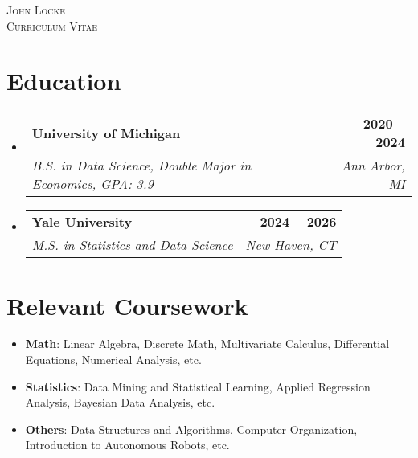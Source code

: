 \documentclass[letterpaper,11pt]{article}
\makeatletter
\newcommand{\resumeSubheading}[4]{
  \vspace{-2pt}\item
    \begin{tabular*}{1.0\textwidth}[t]{l@{\extracolsep{\fill}}r}
      \textbf{#1} & \textbf{\small #2} \\
      \textit{\small#3} & \textit{\small #4} \\
    \end{tabular*}\vspace{-7pt}
}
\newcommand{\resumeSubHeadingListStart}{\begin{itemize}[leftmargin=0.0in, label={}]}
\newcommand{\resumeSubHeadingListEnd}{\end{itemize}}
\makeatother
\begin{document}

\begin{center}
    {\huge \scshape John Locke} \\ \vspace{4pt}
     {\large \scshape Curriculum Vitae} \\
    \vspace{-10pt}
\end{center}

\section{Education}
  \resumeSubHeadingListStart
    \resumeSubheading
      {University of Michigan}{2020 -- 2024}
      {B.S. in Data Science, Double Major in Economics, GPA: 3.9}{Ann Arbor, MI}
      \resumeSubheading
      {Yale University}{2024 -- 2026}
      {M.S. in Statistics and Data Science}{New Haven, CT}
  \resumeSubHeadingListEnd
\vspace{-10pt}

\section{Relevant Coursework}
    \begin{itemize} [itemsep=0pt, parsep=0pt]
        \item\small \textbf{Math}: Linear Algebra, Discrete Math, Multivariate Calculus, Differential Equations, Numerical Analysis, etc.
        \item\small \textbf{Statistics}: Data Mining and Statistical Learning, Applied Regression Analysis, Bayesian Data Analysis, etc.
        \item\small \textbf{Others}: Data Structures and Algorithms, Computer Organization, Introduction to Autonomous Robots, etc.
    \end{itemize}
\vspace{-16pt}

\end{document}
